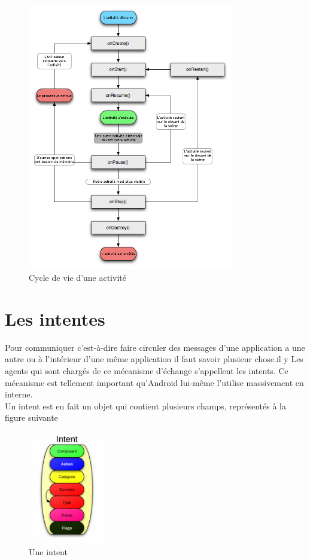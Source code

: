 	\begin{figure}[!h]
    	\center
    		\includegraphics[width=0.8\textwidth]{image/cycle}
   		\caption{Cycle de vie d'une activité}
    	\label{Cycle de vie d'une activité}
	\end{figure}
\section{Les intentes}
Pour communiquer c’est-à-dire faire circuler des messages d’une application a une autre ou à l'intérieur d'une même application il faut savoir plusieur chose.il y Les agents qui sont chargés de ce mécanisme d'échange s'appellent les intents. Ce mécanisme est tellement important qu'Android lui-même l'utilise massivement en interne.\\
Un intent est en fait un objet qui contient plusieurs champs, représentés à la figure suivante
\begin{figure}[!h]
    	\center
    		\includegraphics[width=0.3\textwidth]{image/intent.png}
   		\caption{Une intent}
    	\label{Une intent}
	\end{figure}
